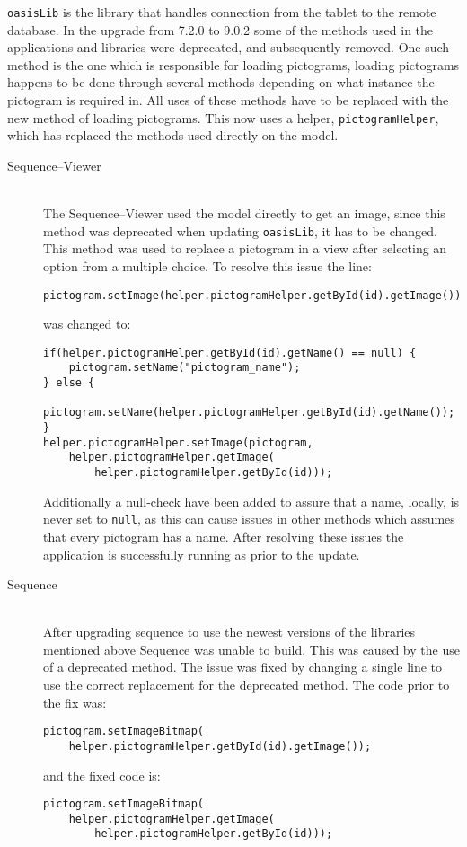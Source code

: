\texttt{oasisLib} is the library that handles connection from the tablet to the remote database.
In the upgrade from 7.2.0 to 9.0.2 some of the methods used in the applications and libraries were deprecated, and subsequently removed. 
One such method is the one which is responsible for loading pictograms, loading pictograms happens to be done through several methods depending on what instance the pictogram is required in. 
All uses of these methods have to be replaced with the new method of loading pictograms. 
This now uses a helper, \texttt{pictogramHelper}, which has replaced the methods used directly on the model. 
  
\begin{description} 
    \item[Sequence--Viewer] \hfill \\ 
    The Sequence--Viewer used the model directly to get an image, since this method was deprecated when updating \texttt{oasisLib}, it has to be changed. 
    This method was used to replace a pictogram in a view after selecting an option from a multiple choice. 
    To resolve this issue the line:
\begin{lstlisting}[frame=l]
pictogram.setImage(helper.pictogramHelper.getById(id).getImage()); 
\end{lstlisting} 
was changed to:
\begin{lstlisting}[frame=l]
if(helper.pictogramHelper.getById(id).getName() == null) { 
    pictogram.setName("pictogram_name"); 
} else { 
    pictogram.setName(helper.pictogramHelper.getById(id).getName()); 
} 
helper.pictogramHelper.setImage(pictogram, 
    helper.pictogramHelper.getImage(
        helper.pictogramHelper.getById(id))); 
\end{lstlisting} 

    Additionally a null-check have been added to assure that a name, locally, is never set to \texttt{null}, as this can cause issues in other methods which assumes that every pictogram has a name. 
    After resolving these issues the application is successfully running as prior to the update. 
     
    \item[Sequence] \hfill \\ 
    After upgrading sequence to use the newest versions of the libraries mentioned above Sequence was unable to build. 
    This was caused by the use of a deprecated method. 
    The issue was fixed by changing a single line to use the correct replacement for the deprecated method. 
    The code prior to the fix was:
\begin{lstlisting}[frame=l]
pictogram.setImageBitmap(
    helper.pictogramHelper.getById(id).getImage()); 
\end{lstlisting} 
    and the fixed code is:
\begin{lstlisting}[frame=l]
pictogram.setImageBitmap( 
    helper.pictogramHelper.getImage(
        helper.pictogramHelper.getById(id))); 
\end{lstlisting} 


\end{description}
